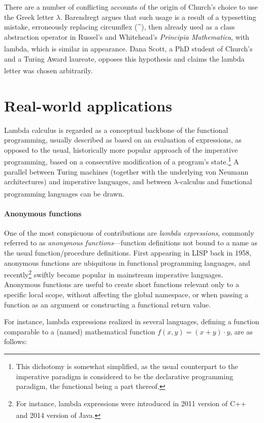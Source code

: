 \documentclass[table, a4paper, 10pt]{book}
\newcommand{\cit}[1]{\textsuperscript{\cite{#1}}}
\begin{document}
There are a number of conflicting accounts of the origin of Church's choice
to use the Greek letter $\lambda$. Barendregt argues that such usage
is a result of a typesetting mistake, erroneously replacing circumflex (\^{}),
then already used as a class abstraction operator in Russel's and Whitehead's
\textit{Principia Mathematica}, with lambda, which is similar in appearance.\cit{barenImpact}
Dana Scott, a PhD student of Church's and a Turing Award laureate, opposes this
hypothesis and claims the lambda letter was chosen arbitrarily.\cit{scottLecture}

\section{Real-world applications}
Lambda calculus is regarded as a conceptual backbone of the
functional programming, usually described as based on an evaluation
of expressions, as opposed to the usual, historically more popular approach of
the imperative programming, based on a consecutive modification of a program's state.\footnote{This dichotomy is somewhat simplified, as the usual counterpart
to the imperative paradigm is considered to be the declarative programming paradigm, the functional being a part thereof.}
A parallel between Turing machines (together with the underlying von Neumann architectures) and imperative languages, and between $\lambda$-calculus
and functional programming languages can be drawn.\cit{baren94}

\paragraph{Anonymous functions}
One of the most conspicuous of contributions are \textit{lambda expressions}, commonly
referred to as \textit{anonymous functions}---function
definitions not bound to a name as the usual function/procedure definitions.
First appearing in LISP back in 1958, anonymous functions are
ubiquitous in functional programming languages, and recently\footnote{For instance, lambda expressions were introduced
in 2011 version of C++ and 2014 version of Java.\cit{cppRef}\cit{oracleRef}} swiftly became popular 
in mainstream imperative languages.
Anonymous functions are useful to create short functions relevant only to a
specific local scope, without affecting the global namespace, or when passing
a function as an argument or constructing a functional return value.

For instance, lambda expressions realized in several languages, defining a function
comparable to a (named) mathematical function $f(x,y) = (x+y) \cdot y$, are as follows:
\end{document}
